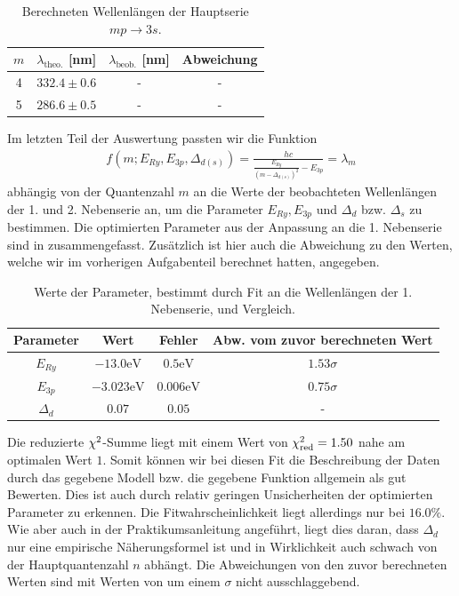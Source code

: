 \begin{table}[H]
  \centering
  \caption{Berechneten Wellenlängen der Hauptserie $mp \to 3s$.}
  \vspace*{0.5em}
  \begin{tabular}{c c c c}
      \hline
      $m$ & $\lambda_{\text{theo.}}$ [nm] & $\lambda_{\text{beob.}}$ [nm] & Abweichung \\
      \hline
      4  & $332.4 \pm 0.6$ & -     & -     \\
      5  & $286.6 \pm 0.5$  & - & - \\
      \hline
  \end{tabular}
  \label{tab:wellenlaengen_hs_zsfm}
\end{table}

Im letzten Teil der Auswertung passten wir die Funktion
\begin{align}
  f(m;E_{Ry}, E_{3p}, \Delta_{d(s)}) = \frac{hc}{\frac{E_{Ry}}{(m - \Delta_{d(s)})^2} - E_{3p}} = \lambda_m
\end{align}
abhängig von der Quantenzahl $m$ an die Werte der beobachteten Wellenlängen der 1. und 2. Nebenserie an, um die Parameter $E_{Ry}, E_{3p}$ und $\Delta_{d}$ bzw. $\Delta_{s}$ zu bestimmen. Die optimierten Parameter aus der Anpassung an die 1. Nebenserie sind in  zusammengefasst. Zusätzlich ist hier auch die Abweichung zu den Werten, welche wir im vorherigen Aufgabenteil berechnet hatten, angegeben.


\begin{table}[H]
  \centering
  \caption{Werte der Parameter, bestimmt durch Fit an die Wellenlängen der 1. Nebenserie, und Vergleich.}
  \vspace*{0.5em}
  \begin{tabular}{c c c c}
      \hline
      Parameter & Wert & Fehler & Abw. vom zuvor berechneten Wert \\
      \hline
      $E_{Ry}$  & $-13.0 \si{\electronvolt}$ & $0.5\si{\electronvolt}$ & $1.53\sigma$ \\
      $E_{3p}$  & $-3.023\si{\electronvolt}$  & $0.006\si{\electronvolt}$ & $0.75\sigma$ \\
      $\Delta_{d}$  & $0.07$  & $0.05$ & - \\
      \hline
  \end{tabular}
  \label{tab:fit_1ns_vergl}
\end{table}

Die reduzierte $\chi^{2}$-Summe liegt mit einem Wert von $\chi^{2}_{\mathrm{red}} = 1.50$ nahe am optimalen Wert $1$. Somit können wir bei diesen Fit die Beschreibung der Daten durch das gegebene Modell bzw. die gegebene Funktion allgemein als gut Bewerten. Dies ist auch durch relativ geringen Unsicherheiten der optimierten Parameter zu erkennen. Die Fitwahrscheinlichkeit liegt allerdings nur bei $16.0\%$. Wie aber auch in der Praktikumsanleitung angeführt, liegt dies daran, dass $\Delta_d$ nur eine empirische Näherungsformel ist und in Wirklichkeit auch schwach von der Hauptquantenzahl $n$ abhängt. Die Abweichungen von den zuvor berechneten Werten sind mit Werten von um einem $\sigma$ nicht ausschlaggebend.

